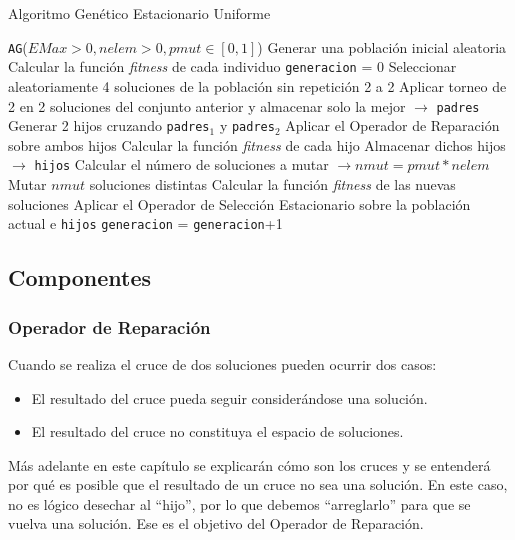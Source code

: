 \begin{algorithm}
\caption{Algoritmo Genético Estacionario Uniforme}\label{alg:AGEU}
\begin{algorithmic}[1]
\Procedure \texttt{AG}($EMax > 0, nelem > 0, pmut \in [0,1]$)
\State Generar una población inicial aleatoria
\State Calcular la función \textit{fitness} de cada individuo
\State \texttt{generacion} = 0
	\State Seleccionar aleatoriamente 4 soluciones de la población sin repetición 2 a 2
	\State Aplicar torneo de 2 en 2 soluciones del conjunto anterior y almacenar solo la mejor $\xrightarrow{}{}$ \texttt{padres}
	\State Generar 2 hijos cruzando \texttt{padres$_1$} y \texttt{padres$_2$}
	\State Aplicar el Operador de Reparación sobre ambos hijos
	\State Calcular la función \textit{fitness} de cada hijo
	\State Almacenar dichos hijos $\xrightarrow{}{}$ \texttt{hijos}
	\State Calcular el número de soluciones a mutar $\xrightarrow{}{} nmut = pmut*nelem$
	\State Mutar $nmut$ soluciones distintas
	\State Calcular la función \textit{fitness} de las nuevas soluciones
	\State Aplicar el Operador de Selección Estacionario sobre la población actual e \texttt{hijos}
	\State \texttt{generacion} = \texttt{generacion}+1
\EndWhile
\EndProcedure
\end{algorithmic}
\end{algorithm}

\subsection{Componentes}

\subsubsection{Operador de Reparación}

Cuando se realiza el cruce de dos soluciones pueden ocurrir dos casos:
\begin{itemize}
	\item El resultado del cruce pueda seguir considerándose una solución.
	\item El resultado del cruce no constituya el espacio de soluciones.
\end{itemize}

Más adelante en este capítulo se explicarán cómo son los cruces y se entenderá por qué es posible que el resultado de un cruce no sea una solución. 
En este caso, no es lógico desechar al ``hijo'', por lo que debemos ``arreglarlo'' para que se vuelva una solución. 
Ese es el objetivo del Operador de Reparación. 

